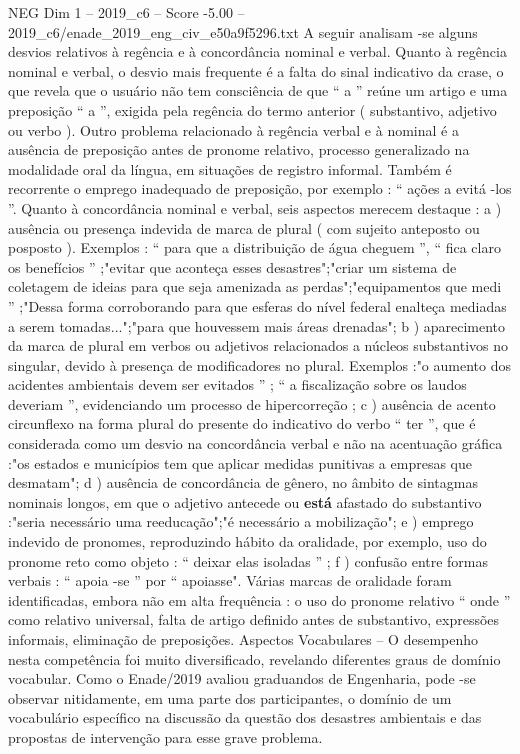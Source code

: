 \begin{textsample}{NEG Dim 1 – 2019\_c6 – Score -5.00 – 2019\_c6/enade\_2019\_eng\_civ\_e50a9f5296.txt}
A seguir analisam -se alguns desvios relativos à regência e à concordância nominal e verbal.
Quanto à regência nominal e verbal, o desvio mais frequente é a falta do sinal indicativo da crase, o que revela que o usuário não tem consciência de que “ a ” reúne um artigo e uma preposição “ a ”, exigida pela regência do termo anterior ( substantivo, adjetivo ou verbo ).
Outro problema relacionado à regência verbal e à nominal é a ausência de preposição antes de pronome relativo, processo generalizado na modalidade oral da língua, em situações de registro informal.
Também é recorrente o emprego inadequado de preposição, por exemplo : “ ações a evitá -los ”.
Quanto à concordância nominal e verbal, seis aspectos merecem destaque : a ) ausência ou presença indevida de marca de plural ( com sujeito anteposto ou posposto ).
Exemplos : “ para que a distribuição de água cheguem ”, “ fica claro os benefícios ” ;"evitar que aconteça esses desastres";"criar um sistema de coletagem de ideias para que seja amenizada as perdas";"equipamentos que medi ” ;"Dessa forma corroborando para que esferas do nível federal enalteça mediadas a serem tomadas...";"para que houvessem mais áreas drenadas"; b ) aparecimento da marca de plural em verbos ou adjetivos relacionados a núcleos substantivos no singular, devido à presença de modificadores no plural.
Exemplos :"o aumento dos acidentes ambientais devem ser evitados ” ; “ a fiscalização sobre os laudos deveriam ”, evidenciando um processo de hipercorreção ; c ) ausência de acento circunflexo na forma plural do presente do indicativo do verbo “ ter ”, que é considerada como um desvio na concordância verbal e não na acentuação gráfica :"os estados e municípios tem que aplicar medidas punitivas a empresas que desmatam"; d ) ausência de concordância de gênero, no âmbito de sintagmas nominais longos, em que o adjetivo antecede ou \textbf{está} afastado do substantivo :"seria necessário uma reeducação";"é necessário a mobilização"; e ) emprego indevido de pronomes, reproduzindo hábito da oralidade, por exemplo, uso do pronome reto como objeto : “ deixar elas isoladas ” ; f ) confusão entre formas verbais : “ apoia -se ” por “ apoiasse".
Várias marcas de oralidade foram identificadas, embora não em alta frequência : o uso do pronome relativo “ onde ” como relativo universal, falta de artigo definido antes de substantivo, expressões informais, eliminação de preposições.
Aspectos Vocabulares – O desempenho nesta competência foi muito diversificado, revelando diferentes graus de domínio vocabular.
Como o Enade/2019 avaliou graduandos de Engenharia, pode -se observar nitidamente, em uma parte dos participantes, o domínio de um vocabulário específico na discussão da questão dos desastres ambientais e das propostas de intervenção para esse grave problema.

\end{textsample}
